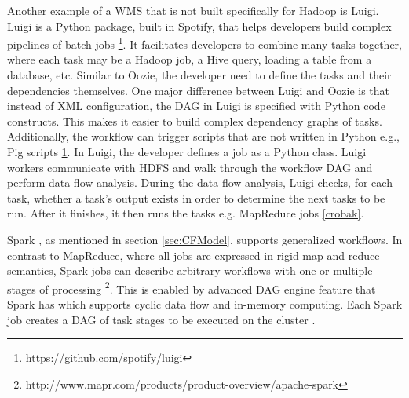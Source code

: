 Another example of a WMS that is not built specifically for Hadoop is Luigi. Luigi is a Python package, built in Spotify, that helps developers build complex pipelines of batch jobs \footnote{\label{luigi}https://github.com/spotify/luigi}. It facilitates developers to combine many tasks together, where each task may be a Hadoop job, a Hive query, loading a table from a database, etc. Similar to Oozie, the developer need to define the tasks and their dependencies themselves. One major difference between Luigi and Oozie is that instead of XML configuration, the DAG in Luigi is specified with Python code constructs. This makes it easier to build complex dependency graphs of tasks. Additionally, the workflow can trigger scripts that are not written in Python e.g., Pig scripts \cref{luigi}. In Luigi, the developer defines a job as a Python class. Luigi workers communicate with HDFS and walk through the workflow DAG and perform data flow analysis. During the data flow analysis, Luigi checks, for each task, whether a task’s output exists in order to determine the next tasks to be run. After it finishes, it then runs the tasks e.g. MapReduce jobs \cref{crobak}. 

Spark \cite{zaharia2010spark}, as mentioned in section \ref{sec:CFModel}, supports generalized workflows. In contrast to MapReduce, where all jobs are expressed in rigid map and reduce semantics, Spark jobs can describe arbitrary workflows with one or multiple stages of processing \footnote{\label{mapr} http://www.mapr.com/products/product-overview/apache-spark}. This is enabled by advanced DAG engine feature that Spark has which supports cyclic data flow and in-memory computing. Each Spark job creates a DAG of task stages to be executed on the cluster \cite{zaharia2012resilient}. 